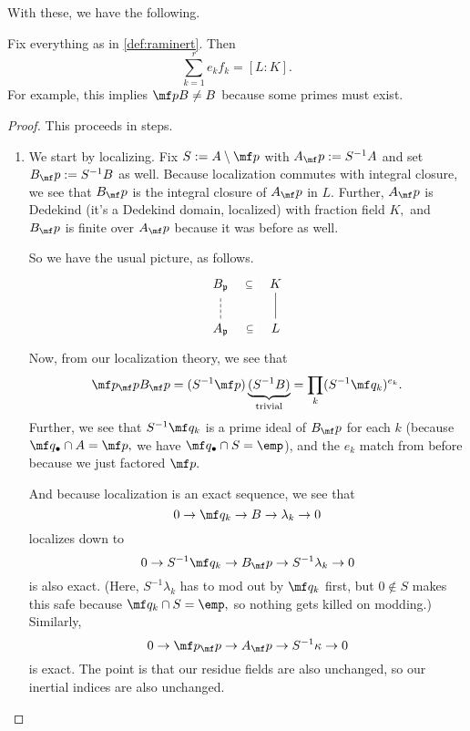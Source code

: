 \documentclass[../notes.tex]{subfiles}
\begin{document}
With these, we have the following.
\begin{proposition}
	Fix everything as in \autoref{def:raminert}. Then
	\[\sum_{k=1}^re_kf_k=[L:K].\]
	For example, this implies $\mf pB\ne B$ because some primes must exist.
\end{proposition}
\begin{proof}
	This proceeds in steps.
	\begin{enumerate}
		\item We start by localizing. Fix $S:=A\setminus\mf p$ with $A_\mf p:=S^{-1}A$ and set $B_\mf p:=S^{-1}B$ as well. Because localization commutes with integral closure, we see that $B_\mf p$ is the integral closure of $A_\mf p$ in $L.$ Further, $A_\mf p$ is Dedekind (it's a Dedekind domain, localized) with fraction field $K,$ and $B_\mf p$ is finite over $A_\mf p$ because it was before as well.\todo{}

		So we have the usual picture, as follows.
		\[\begin{tikzcd}
			{B_\mathfrak p} & K \\
			{A_{\mathfrak p}} & L
			\arrow[no head, from=2-2, to=1-2]
			\arrow[dashed, no head, from=2-1, to=1-1]
			\arrow["\subseteq"{description}, draw=none, from=2-1, to=2-2]
			\arrow["\subseteq"{description}, draw=none, from=1-1, to=1-2]
		\end{tikzcd}\]
		Now, from our localization theory, we see that
		\[\mf p_\mf pB_\mf p=(S^{-1}\mf p)\underbrace{(S^{-1}B)}_{\text{trivial}}=\prod_k(S^{-1}\mf q_k)^{e_k}.\]
		Further, we see that $S^{-1}\mf q_k$ is a prime ideal of $B_\mf p$ for each $k$ (because $\mf q_\bullet\cap A=\mf p,$ we have $\mf q_\bullet\cap S=\emp$), and the $e_k$ match from before because we just factored $\mf p.$

		And because localization is an exact sequence, we see that
		\[0\to\mf q_k\to B\to\lambda_k\to0\]
		localizes down to
		\[0\to S^{-1}\mf q_k\to B_\mf p\to S^{-1}\lambda_k\to0\]
		is also exact. (Here, $S^{-1}\lambda_k$ has to mod out by $\mf q_k$ first, but $0\notin S$ makes this safe because $\mf q_k\cap S=\emp,$ so nothing gets killed on modding.) Similarly,
		\[0\to\mf p_\mf p\to A_\mf p\to S^{-1}\kappa\to0\]
		is exact. The point is that our residue fields are also unchanged\todo{}, so our inertial indices are also unchanged.


\end{enumerate}
\end{proof}
\end{document}
